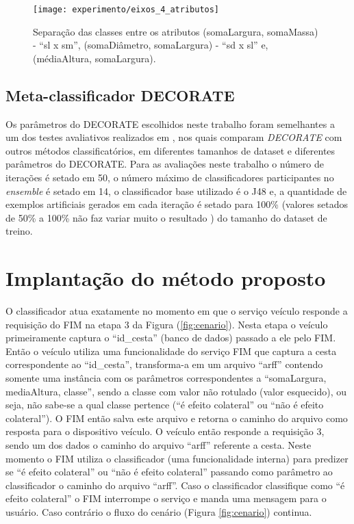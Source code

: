 \begin{figure}[!htb] \centering 
  \centering
  \texttt{[image: experimento/eixos\_4\_atributos]} 
  \caption{Separação das classes entre os atributos (somaLargura, somaMassa) - ``sl x sm'', (somaDiâmetro, somaLargura) - ``sd x sl'' e, (médiaAltura, somaLargura).} 
  \label{fig:eixos_4_atributos}
\end{figure}

\subsection{Meta-classificador DECORATE}
Os parâmetros do DECORATE escolhidos neste trabalho foram semelhantes a um dos testes avaliativos realizados em \cite{Melville:2004}, nos quais comparam \textit{DECORATE} com outros métodos classificatórios, em diferentes tamanhos de dataset e diferentes parâmetros do DECORATE. Para as avaliações neste trabalho o número de iterações é setado em 50, o número máximo de classificadores participantes no \textit{ensemble} é setado em 14, o classificador base utilizado é o J48 e, a quantidade de exemplos artificiais gerados em cada iteração é setado para 100\% (valores setados de 50\% a 100\% não faz variar muito o resultado \cite{Melville:2004}) do tamanho do dataset de treino.

\section{Implantação do método proposto}
O classificador atua exatamente no momento em que o serviço veículo responde a requisição do FIM na etapa 3 da Figura (\ref{fig:cenario}). Nesta etapa o veículo primeiramente captura o ``id\_cesta'' (banco de dados) passado a ele pelo FIM. Então o veículo utiliza uma funcionalidade do serviço FIM que captura a cesta correspondente ao ``id\_cesta'', transforma-a em um arquivo ``arff'' contendo somente uma instância com os parâmetros correspondentes a ``somaLargura, mediaAltura, classe'', sendo a classe com valor não rotulado (valor esquecido), ou seja, não sabe-se a qual classe pertence (``é efeito colateral'' ou ``não é efeito colateral''). O FIM então salva este arquivo e retorna o caminho do arquivo como resposta para o dispositivo veículo. O veículo então responde a requisição 3, sendo um dos dados o caminho do arquivo ``arff'' referente a cesta. Neste momento o FIM utiliza o classificador (uma funcionalidade interna) para predizer se ``é efeito colateral'' ou ``não é efeito colateral'' passando como parâmetro ao classificador o caminho do arquivo ``arff''. Caso o classificador classifique como ``é efeito colateral'' o FIM interrompe o serviço e manda uma mensagem para o usuário. Caso contrário o fluxo do cenário (Figura \ref{fig:cenario}) continua.
